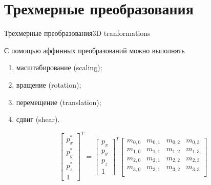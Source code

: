 \documentclass{beamer}
\begin{document}
	\section{Трехмерные преобразования}

	\begin{frame}{Трехмерные преобразования}{3D tranformations}

		С помощью аффинных преобразований можно выполнять
		\begin{enumerate}
			\item масштабирование (scaling);
			\item вращение (rotation);
			\item перемещение (translation);
			\item сдвиг (shear).
		\end{enumerate}
		
		\[
			\begin{bmatrix}
				p_x^{*} \\
				p_y^{*} \\
				p_z^{*} \\
				1
			\end{bmatrix}^T
			=
			\begin{bmatrix}
				p_x \\
				p_y \\
				p_z \\
				1
			\end{bmatrix}^T
			\begin{bmatrix}
				m_{0,0} & m_{0,1} & m_{0,2} & m_{0,3}  \\
				m_{1,0} & m_{1,1} & m_{1,2} & m_{1,3}  \\
				m_{2,0} & m_{2,1} & m_{2,2} & m_{2,3}  \\
				m_{3,0} & m_{3,1} & m_{3,2} & m_{3,3}  \\
			\end{bmatrix}
		\]
\end{frame}
\end{document}

